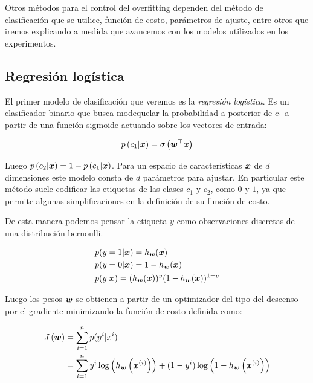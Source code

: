 Otros métodos para el control del overfitting dependen del método de
clasificación que se utilice, función de costo, parámetros de ajuste, entre
otros que iremos explicando a medida que avancemos con los modelos utilizados en
los experimentos.

\subsection{Regresión logística}

El primer modelo de clasificación que veremos es la \emph{regresión logistica}. Es un
clasificador binario que busca modequelar la probabilidad a posterior de $c_1$ a
partir de una función sigmoide actuando sobre los vectores de
entrada:

\begin{align}
    p\left( c_1 | \boldsymbol{x} \right) = \sigma\left( \boldsymbol{w}^{\top} \boldsymbol{x} \right)
\end{align}

Luego $p\left( c_2 | \boldsymbol{x} \right) = 1 - p\left( c_1 | \boldsymbol{x} \right)$.
Para un espacio de características $\boldsymbol{x}$ de $d$ dimensiones este modelo
consta de $d$ parámetros para ajustar. En particular este método suele codificar
las etiquetas de las clases $c_1$ y $c_2$, como $0$ y $1$, ya que permite
algunas simplificaciones en la definición de su función de costo.

De esta manera podemos pensar la etiqueta $y$ como observaciones discretas de una
distribución bernoulli.

\begin{align}
    & p(y = 1 | \boldsymbol{x}) = h_{\boldsymbol{w}}(\boldsymbol{x}) \\
    & p(y = 0 | \boldsymbol{x}) = 1 - h_{\boldsymbol{w}}(\boldsymbol{x}) \\
    & p(y | \boldsymbol{x}) = (h_{\boldsymbol{w}}(\boldsymbol{x}))^{y}(1 - h_{\boldsymbol{w}}(\boldsymbol{x}))^{1 - y}
\end{align}

Luego los pesos $\boldsymbol{w}$ se obtienen a partir de un optimizador del tipo del
descenso por el gradiente minimizando la función de costo definida como:

\begin{align}
    J\left( \boldsymbol{w} \right) &= \sum_{i=1}^{n} p(y^{i} | x^{i}) \\
                             &= \sum_{i=1}^{n}
                                    y^{i}\log\left( h_{\boldsymbol{w}}\left( \boldsymbol{x}^{(i)} \right) \right) +
                                    (1 - y^{i})\log\left(1 - h_{\boldsymbol{w}}\left( \boldsymbol{x}^{(i)} \right) \right)
\end{align}

